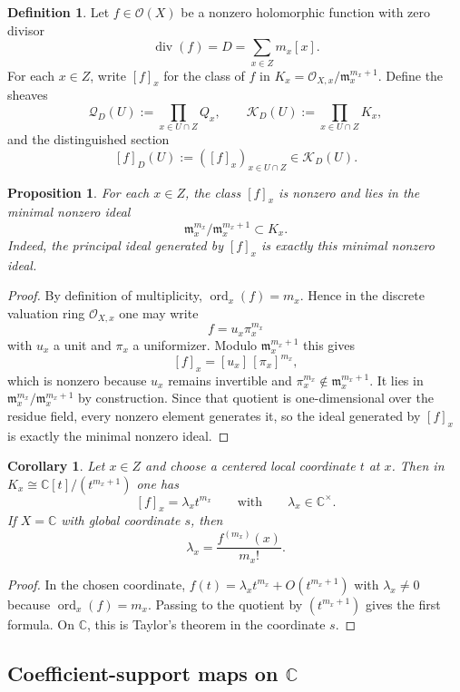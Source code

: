 \documentclass[11pt,a4paper]{article}
\newtheorem{proposition}[theorem]{Proposition}
\newtheorem{corollary}[theorem]{Corollary}
\theoremstyle{definition}
\newtheorem{definition}[theorem]{Definition}
\theoremstyle{remark}
\DeclareMathOperator{\ord}{ord}
\newcommand{\CC}{\mathbb C}
\newcommand{\cO}{\mathcal O}
\newcommand{\cQ}{\mathcal Q}
\newcommand{\cK}{\mathcal K}
\begin{document}
\begin{definition}
Let $f\in\cO(X)$ be a nonzero holomorphic function with zero divisor
\[
\operatorname{div}(f)=D=\sum_{x\in Z}m_x[x].
\]
For each $x\in Z$, write $[f]_x$ for the class of $f$ in $K_x=\cO_{X,x}/\mathfrak m_x^{m_x+1}$.  Define the sheaves
\[
\cQ_D(U):=\prod_{x\in U\cap Z}Q_x,
\qquad
\cK_D(U):=\prod_{x\in U\cap Z}K_x,
\]
and the distinguished section
\[
[f]_D(U):=([f]_x)_{x\in U\cap Z}\in\cK_D(U).
\]
\end{definition}

\begin{proposition}\label{prop:derivative-enhanced-local}
For each $x\in Z$, the class $[f]_x$ is nonzero and lies in the minimal nonzero ideal
\[
\mathfrak m_x^{m_x}/\mathfrak m_x^{m_x+1}\subset K_x.
\]
Indeed, the principal ideal generated by $[f]_x$ is exactly this minimal nonzero ideal.
\end{proposition}

\begin{proof}
By definition of multiplicity, $\ord_x(f)=m_x$.  Hence in the discrete valuation ring $\cO_{X,x}$ one may write
\[
f=u_x\pi_x^{m_x}
\]
with $u_x$ a unit and $\pi_x$ a uniformizer.  Modulo $\mathfrak m_x^{m_x+1}$ this gives
\[
[f]_x=[u_x]\,[\pi_x]^{m_x},
\]
which is nonzero because $u_x$ remains invertible and $\pi_x^{m_x}\notin\mathfrak m_x^{m_x+1}$.  It lies in $\mathfrak m_x^{m_x}/\mathfrak m_x^{m_x+1}$ by construction.  Since that quotient is one-dimensional over the residue field, every nonzero element generates it, so the ideal generated by $[f]_x$ is exactly the minimal nonzero ideal.
\end{proof}

\begin{corollary}\label{cor:coordinate-derivative}
Let $x\in Z$ and choose a centered local coordinate $t$ at $x$.  Then in $K_x\cong\CC[t]/(t^{m_x+1})$ one has
\[
[f]_x=\lambda_x t^{m_x}
\qquad\text{with}\qquad
\lambda_x\in\CC^\times.
\]
If $X=\CC$ with global coordinate $s$, then
\[
\lambda_x=\frac{f^{(m_x)}(x)}{m_x!}.
\]
\end{corollary}

\begin{proof}
In the chosen coordinate, $f(t)=\lambda_x t^{m_x}+O(t^{m_x+1})$ with $\lambda_x\neq0$ because $\ord_x(f)=m_x$.  Passing to the quotient by $(t^{m_x+1})$ gives the first formula.  On $\CC$, this is Taylor's theorem in the coordinate $s$.
\end{proof}

\subsection{Coefficient-support maps on $\CC$}
\end{document}
